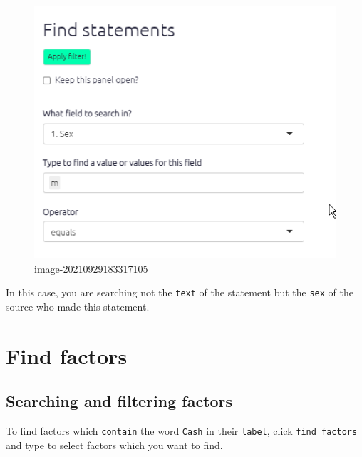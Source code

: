 \documentclass[
]{book}
\begin{document}
\begin{figure}
\centering
\includegraphics[width=6.77083in,height=\textheight]{_assets/image-20210929183317105.png}
\caption{image-20210929183317105}
\end{figure}

In this case, you are searching not the \texttt{text} of the statement but the \texttt{sex} of the source who made this statement.

\hypertarget{find-factors}{%
\section{Find factors}\label{find-factors}}

\hypertarget{searching-and-filtering-factors}{%
\subsection{Searching and filtering factors}\label{searching-and-filtering-factors}}

To find factors which \texttt{contain} the word \texttt{Cash} in their \texttt{label}, click \texttt{find\ factors} and type to select factors which you want to find.
\end{document}
